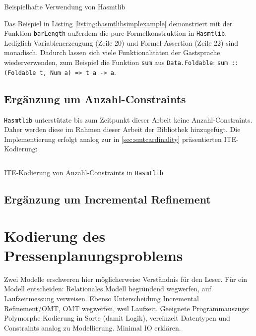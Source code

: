 \begin{listing}[H]
    \inputminted[linenos=true]{haskell}{Code/Implementierung/Hasmtlib/BeispielSimple.hs}
    \caption{Beispielhafte Verwendung von Hasmtlib}
    \label{listing:hasmtlibsimplexample}
\end{listing}

Das Beispiel in Listing \ref{listing:hasmtlibsimplexample} demonstriert mit der Funktion \texttt{barLength} außerdem die pure Formelkonstruktion in \texttt{Hasmtlib}.
Lediglich Variablenerzeugung (Zeile 20) und Formel-Assertion (Zeile 22) sind monadisch.
Dadurch lassen sich viele Funktionalitäten der Gastsprache wiederverwenden, zum Beispiel die Funktion \texttt{sum} aus \texttt{Data.Foldable}:
\texttt{sum :: (Foldable t, Num a) => t a -> a}.

\subsection{Ergänzung um Anzahl-Constraints}
\label{subsec:implCardinality}
\texttt{Hasmtlib} unterstützte bis zum Zeitpunkt dieser Arbeit keine Anzahl-Constraints.
Daher werden diese im Rahmen dieser Arbeit der Bibliothek hinzugefügt.
Die Implementierung erfolgt analog zur in \ref{sec:smtcardinality} präsentierten ITE-Kodierung:

\begin{listing}[H]
    \inputminted[linenos=true]{haskell}{Code/Implementierung/Hasmtlib/Cardinality.hs}
    \caption{ITE-Kodierung von Anzahl-Constraints in \texttt{Hasmtlib} \cite{hasmtlibCardinality}}
    \label{listing:hasmtlibcardinality}
\end{listing}

\subsection{Ergänzung um Incremental Refinement}

\section{Kodierung des Pressenplanungsproblems}
\label{sec:kodierung}
Zwei Modelle erschweren hier möglicherweise Verständnis für den Leser.
Für ein Modell entscheiden: Relationales Modell begründend wegwerfen, auf Laufzeitmessung verweisen.
Ebenso Unterscheidung Incremental Refinement/OMT, OMT wegwerfen, weil Laufzeit.
Geeignete Programmauszüge: Polymorphe Kodierung in Sorte (damit Logik), vereinzelt Datentypen und Constraints analog zu Modellierung.
Minimal IO erklären.
